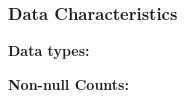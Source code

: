 \documentclass[12pt]{article}
\begin{document}
\subsubsection{Data Characteristics}
\begin{comment}

\vspace{5pt}
\textbf{Size:} The dataset includes district-level enrollment and coverage data, which covers a large number of records across various districts, crops, and states. 
The data spans several years, beginning from 2018, and continues up to the Rabi 2022-23 season. There are 29999 rows and 62 columns. Thus, the dataset implies data records of 29999 incidents w.r.t 62 features which are taken.
\vspace{5pt}

\textbf{Time span:} The data covers the period from the introduction of the PMFBY scheme in 2018 up to February 2023, ensuring a wide temporal range for analysis. This includes multiple agricultural seasons (Kharif, Rabi), allowing for seasonal comparisons.
\vspace{5pt}
\end{comment}

\textbf{Data types:}
\begin{comment}

\begin{itemize}
\item{Integer (int64): Used for categorical variables like IDs (e.g., sssyID, seasonCode, stateCode) and numerical values (e.g., year, schemeCode).}
\item{Float (float64): Used for numerical variables such as sumInsured, premiumRate, stateShare, and goiShare.}
\item{Object (object): Used for textual data, including categorical variables like seasonName, stateName, cropName, and insurance company details.}
\item{Boolean (bool): Used for flags, such as whether a record has specific characteristics (e.g., isOfflineChallan).}
\end{itemize}
\end{comment}
\vspace{5pt}

\textbf{Non-null Counts: }
\begin{comment}
All columns in the dataset have 29999 non-null entries, indicating that the dataset does not have missing values for the variables in question. This suggests that the data has been adequately prepared and cleaned for analysis.
\vspace{5pt}
\end{comment}
\end{document}
